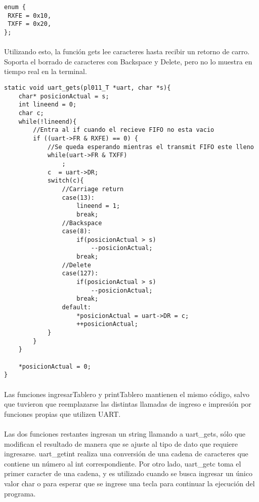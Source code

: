 \documentclass{article}
\begin{document}
\begin{lstlisting}
enum {
 RXFE = 0x10,
 TXFF = 0x20,
};

\end{lstlisting}

\paragraph{}
Utilizando esto, la funci\'on gets lee caracteres hasta recibir un retorno de carro. Soporta el borrado de caracteres con Backspace y Delete, pero no lo muestra en tiempo real en la terminal.

\begin{lstlisting}
static void uart_gets(pl011_T *uart, char *s){
	char* posicionActual = s;
	int lineend = 0;
	char c;
	while(!lineend){
		//Entra al if cuando el recieve FIFO no esta vacio
		if ((uart->FR & RXFE) == 0) {
			//Se queda esperando mientras el transmit FIFO este lleno
			while(uart->FR & TXFF)
				;
			c  = uart->DR;
			switch(c){
				//Carriage return
				case(13):
					lineend = 1;
					break;
				//Backspace
				case(8):
					if(posicionActual > s)
						--posicionActual;
					break;
				//Delete
				case(127):
					if(posicionActual > s)
						--posicionActual;
					break;
				default:
					*posicionActual = uart->DR = c;
					++posicionActual;
			}
		}
	}
	
	*posicionActual = 0;
}
\end{lstlisting}

\paragraph{}
Las funciones ingresarTablero y printTablero mantienen el mismo c\'odigo, salvo que tuvieron que reemplazarse las distintas llamadas de ingreso e impresi\'on por funciones propias que utilizen UART.

\paragraph{}
Las dos funciones restantes ingresan un string llamando a uart\_gets, s\'olo que modifican el resultado de manera que se ajuste al tipo de dato que requiere ingresarse. uart\_getint realiza una conversi\'on de una cadena de caracteres que contiene un n\'umero al int correspondiente. Por otro lado, uart\_getc toma el primer caracter de una cadena, y es utilizado cuando se busca ingresar un \'unico valor char o para esperar que se ingrese una tecla para continuar la ejecuci\'on del programa.
\end{document}
